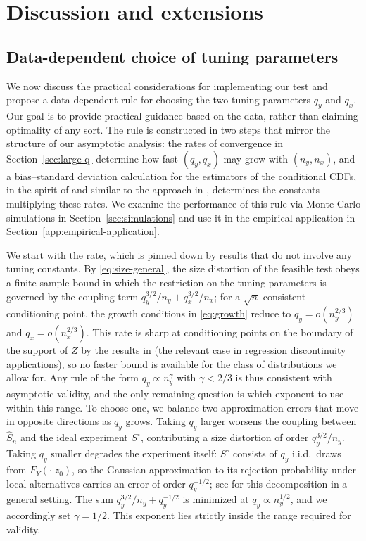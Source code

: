 \documentclass[11pt]{article}
\numberwithin{equation}{section}
\begin{document}
\section{Discussion and extensions}\label{sec:extensions}

\subsection{Data-dependent choice of tuning parameters}\label{sec:tuning-parameters}
We now discuss the practical considerations for implementing our test and propose a data-dependent rule for choosing the two tuning parameters $q_y$ and $q_x$. Our goal is to provide practical guidance based on the data, rather than claiming optimality of any sort. The rule is constructed in two steps that mirror the structure of our asymptotic analysis: the rates of convergence in Section~\ref{sec:large-q} determine how fast $(q_y,q_x)$ may grow with $(n_y,n_x)$, and a bias--standard deviation calculation for the estimators of the conditional CDFs, in the spirit of \citet{armstrong/kolesar:18} and similar to the approach in \citet{bugni/canay:21}, determines the constants multiplying these rates. We examine the performance of this rule via Monte Carlo simulations in Section~\ref{sec:simulations} and use it in the empirical application in Section~\ref{app:empirical-application}.

We start with the rate, which is pinned down by results that do not involve any tuning constants. By \eqref{eq:size-general}, the size distortion of the feasible test obeys a finite-sample bound in which the restriction on the tuning parameters is governed by the coupling term $q_y^{3/2}/n_y + q_x^{3/2}/n_x$; for a $\sqrt{n}$-consistent conditioning point, the growth conditions in \eqref{eq:growth} reduce to $q_y = o(n_y^{2/3})$ and $q_x = o(n_x^{2/3})$. This rate is sharp at conditioning points on the boundary of the support of $Z$ by the results in \cite{bugni/canay/kim:26b} (the relevant case in regression discontinuity applications), so no faster bound is available for the class of distributions we allow for. Any rule of the form $q_y \propto n_y^{\gamma}$ with $\gamma < 2/3$ is thus consistent with asymptotic validity, and the only remaining question is which exponent to use within this range. To choose one, we balance two approximation errors that move in opposite directions as $q_y$ grows. Taking $q_y$ larger worsens the coupling between $\hat S_n$ and the ideal experiment $S^{\circ}$, contributing a size distortion of order $q_y^{3/2}/n_y$. Taking $q_y$ smaller degrades the experiment itself: $S^{\circ}$ consists of $q_y$ i.i.d.\ draws from $F_Y(\cdot|z_0)$, so the Gaussian approximation to its rejection probability under local alternatives carries an error of order $q_y^{-1/2}$; see \citet{bugni/canay/kim:26b} for this decomposition in a general setting. The sum $q_y^{3/2}/n_y + q_y^{-1/2}$ is minimized at $q_y \propto n_y^{1/2}$, and we accordingly set $\gamma = 1/2$. This exponent lies strictly inside the range required for validity.
\end{document}
